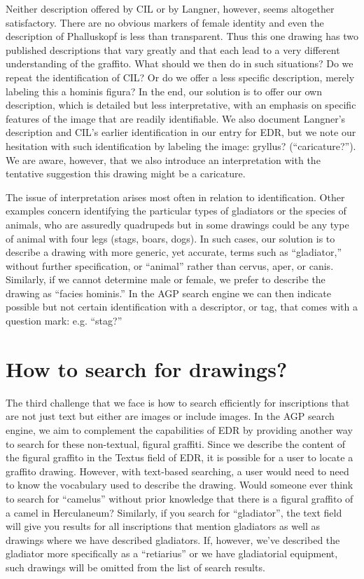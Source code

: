 \documentclass[amsthm,ebook]{saparticle}
\begin{document}
Neither description offered by CIL or by Langner, however, seems altogether satisfactory. There are no obvious markers
of female identity and even the description of Phalluskopf is less than transparent. Thus this one drawing has two
published descriptions that vary greatly and that each lead to a very different understanding of the graffito. What
should we then do in such situations? Do we repeat the identification of CIL? Or do we offer a less specific
description, merely labeling this a hominis figura? In the end, our solution is to offer our own description, which
is detailed but less interpretative, with an emphasis on specific features of the image that are readily identifiable.
We also document Langner’s description and CIL’s earlier identification in our entry for EDR, but we note our
hesitation with such identification by labeling the image: gryllus? (``caricature?''). We are aware, however, that we
also introduce an interpretation with the tentative suggestion this drawing might be a caricature. 

The issue of interpretation arises most often in relation to identification. Other examples concern identifying the
particular types of gladiators or the species of animals, who are assuredly quadrupeds but in some drawings could be
any type of animal with four legs (stags, boars, dogs). In such cases, our solution is to describe a drawing with more
generic, yet accurate, terms such as ``gladiator,'' without further specification, or ``animal'' rather than cervus, aper,
or canis. Similarly, if we cannot determine male or female, we prefer to describe the drawing as ``facies hominis.'' In
the AGP search engine we can then indicate possible but not certain identification with a descriptor, or tag, that
comes with a question mark: e.g. ``stag?'' 




\section{How to search for drawings?}


\noindent The third challenge that we face is how to search efficiently for inscriptions that are not just text but either are
images or include images. In the AGP search engine, we aim to complement the capabilities of EDR by providing another
way to search for these non-textual, figural graffiti. Since we describe the content of the figural graffito in the
Textus field of EDR, it is possible for a user to locate a graffito drawing. However, with text-based searching, a user
would need to need to know the vocabulary used to describe the drawing. Would someone ever think to search for
``camelus'' without prior knowledge that there is a figural graffito of a camel in Herculaneum? Similarly, if you
search for ``gladiator'', the text field will give you results for all inscriptions that mention gladiators as well as
drawings where we have described gladiators. If, however, we’ve described the gladiator more specifically as a
``retiarius'' or we have gladiatorial equipment, such drawings will be omitted from the list of search results.
\end{document}
